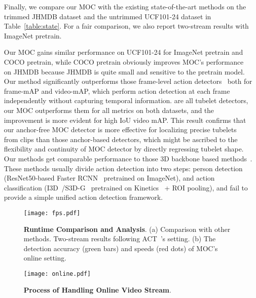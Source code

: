 \documentclass[runningheads]{llncs}
\begin{document}
 Finally, we compare our MOC with the existing state-of-the-art methods on the trimmed JHMDB dataset and the untrimmed UCF101-24 dataset in Table~\ref{table:state}. For a fair comparison, we also report two-stream results with ImageNet pretrain.

 Our MOC gains similar performance on UCF101-24 for ImageNet pretrain and COCO pretrain, while COCO pretrain obviously improves MOC's performance on JHMDB because JHMDB is quite small and sensitive to the pretrain model.
 Our method significantly outperforms those frame-level action detectors~\cite{SahaSSTC16,peng2016multi,singh2017online} both for frame-mAP and video-mAP, which perform action detection at each frame independently without capturing temporal information. \cite{kalogeiton2017action,yang2019step,zhao2019dance,song2019tacnet} are all tubelet detectors, our MOC outperforms them for all metrics on both datasets, and the improvement is more evident for high IoU video mAP. This result confirms that our anchor-free MOC detector is more effective for localizing precise tubelets from clips than those anchor-based detectors, which might be ascribed to the flexibility and continuity of MOC detector by directly regressing tubelet shape.
 Our methods get comparable performance to those 3D backbone based methods~\cite{hou2017tube,gu2018ava,SunSVMSS18}. These methods usually divide action detection into two steps: person detection (ResNet50-based Faster RCNN~\cite{ren2015faster} pretrained on ImageNet), and action classification (I3D~\cite{carreira2017quo}/S3D-G~\cite{xie2018rethinking} pretrained on Kinetics~\cite{carreira2017quo} + ROI pooling), and fail to provide a simple unified action detection framework.

\begin{figure}
  \centering
    \texttt{[image: fps.pdf]}
    \caption{{\bf Runtime Comparison and Analysis}. (a) Comparison with other methods. Two-stream results following ACT~\cite{kalogeiton2017action}'s setting. (b) The detection accuracy (green bars) and speeds (red dots) of MOC's online setting.}
  \label{fig:runtime}
\end{figure}
\begin{figure}
  \centering
    \texttt{[image: online.pdf]}
    \caption{{\bf Process of Handling Online Video Stream}.}
  \label{fig:online}
\end{figure}
\end{document}
